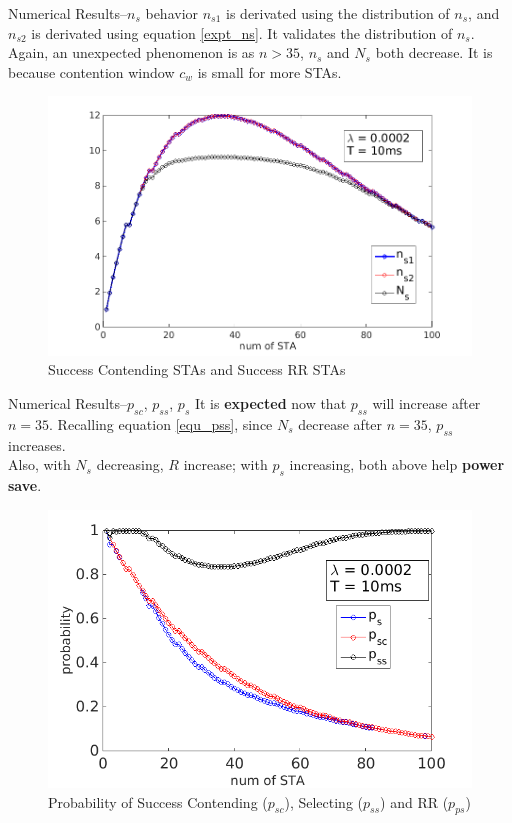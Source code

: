 \documentclass[10pt]{beamer}
\begin{document}
\begin{frame}{Numerical Results--$n_s$ behavior}
$n_{s1}$ is derivated using the distribution of $n_s$, and $n_{s2}$ is derivated using equation \ref{expt_ns}.
It validates the distribution of $n_s$.\\
Again, an unexpected phenomenon is as $n>35$, $n_s$ and $N_s$ both decrease. 
It is because contention window $c_w$ is small for more STAs.
\begin{figure}
\includegraphics[scale=0.35]{./figure/test_ns.png}
\caption{Success Contending STAs and Success RR STAs}
\label{test_ns}
\end{figure}
\end{frame}

\begin{frame}{Numerical Results--$p_{sc}$, $p_{ss}$, $p_s$}
It is \textbf{expected} now that $p_{ss}$ will increase after $n=35$.
Recalling equation \ref{equ_pss}, since $N_s$ decrease after $n=35$, $p_{ss}$ increases. \\
Also, with $N_s$ decreasing, $R$ increase; with $p_s$ increasing, both above help \textbf{power save}. 
\begin{figure}
\includegraphics[scale=0.45]{./figure/test_ps.png}
\caption{Probability of Success Contending ($p_{sc}$), Selecting ($p_{ss}$) and RR ($p_{ps}$)}
\label{test_per}
\end{figure}
\end{frame}
\end{document}
